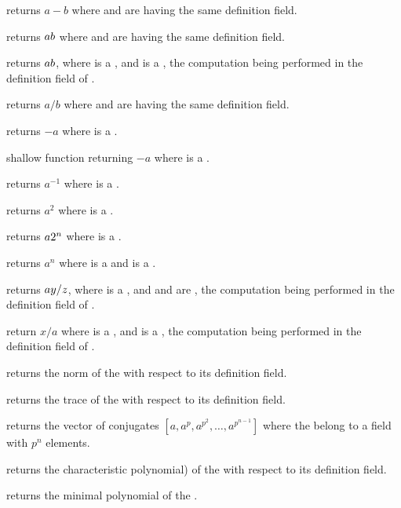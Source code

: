  returns $a-b$ where  and  are
 having the same definition field.

 returns $a\*b$ where  and  are
 having the same definition field.

 returns $a\*b$, where  is a
, and  is a , the computation being
performed in the definition field of .

 returns $a/b$ where  and  are
 having the same definition field.

 returns $-a$ where  is a .

 shallow function returning $-a$ where  is a
.

 returns $a^{-1}$ where  is a .

 returns $a^2$ where  is a .

 returns $a\*2^n$ where  is a
.

 returns $a^n$ where  is a 
and is a .

 returns $a\*y/z$, where 
is a , and  and  are , the computation being
performed in the definition field of .

 return $x/a$ where  is a
, and  is a , the computation being
performed in the definition field of .

 returns the norm of the   with
respect to its definition field.

 returns the trace of the   with
respect to its definition field.

 returns the vector of conjugates
$[a,a^p,a^{p^2},\ldots,a^{p^{n-1}}]$ where the   belong to a
field with $p^n$ elements.

 returns the characteristic polynomial) of the
  with respect to its definition field.

 returns the minimal polynomial of
the  .

